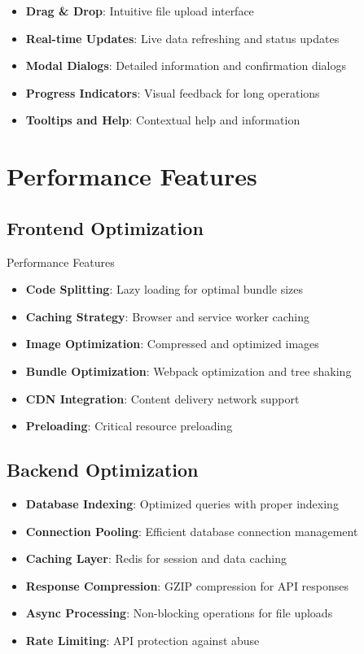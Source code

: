 \documentclass[11pt,a4paper]{article}
\begin{document}
\begin{itemize}
    \item \textbf{Drag \& Drop}: Intuitive file upload interface
    \item \textbf{Real-time Updates}: Live data refreshing and status updates
    \item \textbf{Modal Dialogs}: Detailed information and confirmation dialogs
    \item \textbf{Progress Indicators}: Visual feedback for long operations
    \item \textbf{Tooltips and Help}: Contextual help and information
\end{itemize}

\section{Performance Features}

\subsection{Frontend Optimization}

\begin{techbox}{\faRocket\space Performance Features}
\begin{itemize}
    \item \textbf{Code Splitting}: Lazy loading for optimal bundle sizes
    \item \textbf{Caching Strategy}: Browser and service worker caching
    \item \textbf{Image Optimization}: Compressed and optimized images
    \item \textbf{Bundle Optimization}: Webpack optimization and tree shaking
    \item \textbf{CDN Integration}: Content delivery network support
    \item \textbf{Preloading}: Critical resource preloading
\end{itemize}
\end{techbox}

\subsection{Backend Optimization}

\begin{itemize}
    \item \textbf{Database Indexing}: Optimized queries with proper indexing
    \item \textbf{Connection Pooling}: Efficient database connection management
    \item \textbf{Caching Layer}: Redis for session and data caching
    \item \textbf{Response Compression}: GZIP compression for API responses
    \item \textbf{Async Processing}: Non-blocking operations for file uploads
    \item \textbf{Rate Limiting}: API protection against abuse
\end{itemize}
\end{document}
